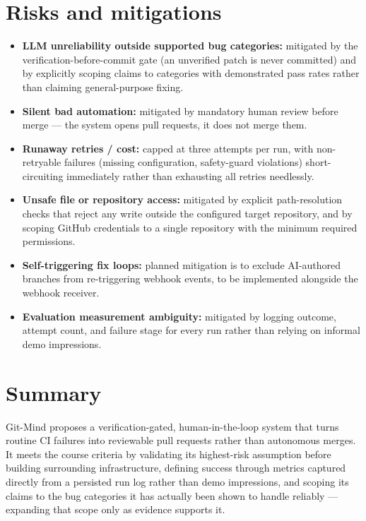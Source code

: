 \documentclass[11pt,a4paper]{article}
\begin{document}
\section{Risks and mitigations}
\begin{itemize}[leftmargin=0.7cm]
    \item \textbf{LLM unreliability outside supported bug
      categories:} mitigated by the verification-before-commit gate
      (an unverified patch is never committed) and by explicitly
      scoping claims to categories with demonstrated pass rates
      rather than claiming general-purpose fixing.
    \item \textbf{Silent bad automation:} mitigated by mandatory
      human review before merge --- the system opens pull requests,
      it does not merge them.
    \item \textbf{Runaway retries / cost:} capped at three attempts
      per run, with non-retryable failures (missing configuration,
      safety-guard violations) short-circuiting immediately rather
      than exhausting all retries needlessly.
    \item \textbf{Unsafe file or repository access:} mitigated by
      explicit path-resolution checks that reject any write outside
      the configured target repository, and by scoping GitHub
      credentials to a single repository with the minimum required
      permissions.
    \item \textbf{Self-triggering fix loops:} planned mitigation is
      to exclude AI-authored branches from re-triggering webhook
      events, to be implemented alongside the webhook receiver.
    \item \textbf{Evaluation measurement ambiguity:} mitigated by
      logging outcome, attempt count, and failure stage for every
      run rather than relying on informal demo impressions.
\end{itemize}

\section{Summary}
Git-Mind proposes a verification-gated, human-in-the-loop system
that turns routine CI failures into reviewable pull requests rather
than autonomous merges. It meets the course criteria by validating
its highest-risk assumption before building surrounding
infrastructure, defining success through metrics captured directly
from a persisted run log rather than demo impressions, and scoping
its claims to the bug categories it has actually been shown to
handle reliably --- expanding that scope only as evidence supports
it.
\end{document}
